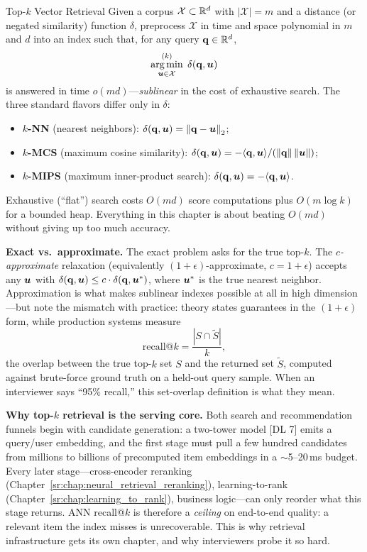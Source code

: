 \begin{mathresult}{Top-$k$ Vector Retrieval}
Given a corpus $\mathcal{X} \subset \mathbb{R}^d$ with $|\mathcal{X}| = m$ and a distance (or negated similarity) function $\delta$, preprocess $\mathcal{X}$ in time and space polynomial in $m$ and $d$ into an index such that, for any query $\mathbf{q} \in \mathbb{R}^d$,
\begin{equation}
\operatorname*{arg\,min}^{(k)}_{\bm{u} \in \mathcal{X}} \; \delta(\mathbf{q}, \bm{u})
\end{equation}
is answered in time $o(md)$---\emph{sublinear} in the cost of exhaustive search. The three standard flavors differ only in $\delta$:
\begin{itemize}
    \item \textbf{$k$-NN} (nearest neighbors): $\delta(\mathbf{q},\bm{u}) = \left\lVert\mathbf{q} - \bm{u}\right\rVert_2$;
    \item \textbf{$k$-MCS} (maximum cosine similarity): $\delta(\mathbf{q},\bm{u}) = -\langle\mathbf{q},\bm{u}\rangle / (\left\lVert\mathbf{q}\right\rVert\left\lVert\bm{u}\right\rVert)$;
    \item \textbf{$k$-MIPS} (maximum inner-product search): $\delta(\mathbf{q},\bm{u}) = -\langle\mathbf{q},\bm{u}\rangle$.
\end{itemize}
Exhaustive (``flat'') search costs $O(md)$ score computations plus $O(m \log k)$ for a bounded heap. Everything in this chapter is about beating $O(md)$ without giving up too much accuracy.
\end{mathresult}

\textbf{Exact vs.\ approximate.} The exact problem asks for the true top-$k$. The \emph{$c$-approximate} relaxation (equivalently $(1+\epsilon)$-approximate, $c = 1+\epsilon$) accepts any $\bm{u}$ with $\delta(\mathbf{q},\bm{u}) \le c \cdot \delta(\mathbf{q},\bm{u}^*)$, where $\bm{u}^*$ is the true nearest neighbor. Approximation is what makes sublinear indexes possible at all in high dimension---but note the mismatch with practice: theory states guarantees in the $(1+\epsilon)$ form, while production systems measure
\begin{equation}
\text{recall@}k = \frac{|S \cap \tilde{S}|}{k},
\end{equation}
the overlap between the true top-$k$ set $S$ and the returned set $\tilde{S}$, computed against brute-force ground truth on a held-out query sample. When an interviewer says ``95\% recall,'' this set-overlap definition is what they mean.

\textbf{Why top-$k$ retrieval is the serving core.} Both search and recommendation funnels begin with candidate generation: a two-tower model [DL 7] emits a query/user embedding, and the first stage must pull a few hundred candidates from millions to billions of precomputed item embeddings in a $\sim$5--20\,ms budget. Every later stage---cross-encoder reranking (Chapter~\ref{sr:chap:neural_retrieval_reranking}), learning-to-rank (Chapter~\ref{sr:chap:learning_to_rank}), business logic---can only reorder what this stage returns. ANN recall@$k$ is therefore a \emph{ceiling} on end-to-end quality: a relevant item the index misses is unrecoverable. This is why retrieval infrastructure gets its own chapter, and why interviewers probe it so hard.

